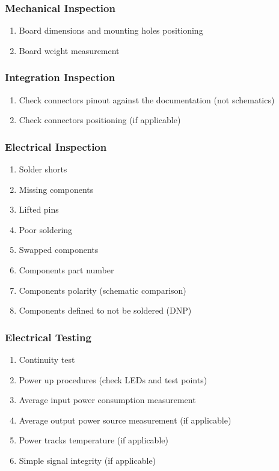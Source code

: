 \subsubsection{Mechanical Inspection}
\begin{enumerate} \setlength\itemsep{-0.3em}
    \item Board dimensions and mounting holes positioning
    \item Board weight measurement
\end{enumerate}

\subsubsection{Integration Inspection}
\begin{enumerate} \setlength\itemsep{-0.3em}
    \item Check connectors pinout against the documentation (not schematics)
    \item Check connectors positioning (if applicable)
\end{enumerate}

\subsubsection{Electrical Inspection}
\begin{enumerate} \setlength\itemsep{-0.3em}
    \item Solder shorts
    \item Missing components
    \item Lifted pins
    \item Poor soldering
    \item Swapped components
    \item Components part number
    \item Components polarity (schematic comparison)
    \item Components defined to not be soldered (DNP)
\end{enumerate}

\subsubsection{Electrical Testing}
\begin{enumerate} \setlength\itemsep{-0.3em}
    \item Continuity test
    \item Power up procedures (check LEDs and test points)
    \item Average input power consumption measurement
    \item Average output power source measurement (if applicable) 
    \item Power tracks temperature (if applicable)
    \item Simple signal integrity (if applicable)
\end{enumerate}

